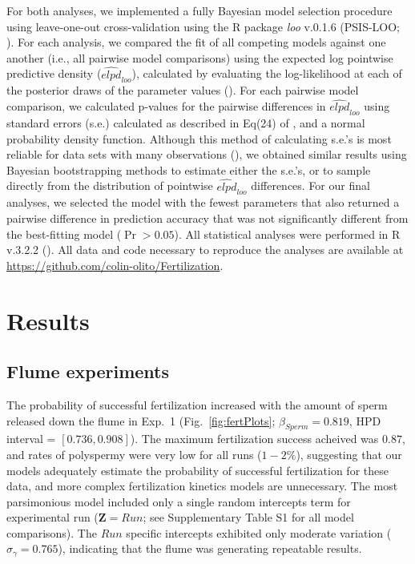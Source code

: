 \documentclass{article}
\begin{document}
	For both analyses, we implemented a fully Bayesian model selection procedure using leave-one-out cross-validation using the R package \textit{loo} v.0.1.6 (PSIS-LOO; \citealt{Vehtari2016}). For each analysis, we compared the fit of all competing models against one another (i.e., all pairwise model comparisons) using the expected log pointwise predictive density ($\widehat{\textit{elpd}}_{\textit{loo}}$), calculated by evaluating the log-likelihood at each of the posterior draws of the parameter values (\citealt{HootenHobbs2015,Vehtari2016}). For each pairwise model comparison, we calculated p-values for the pairwise differences in $\widehat{\textit{elpd}}_{\textit{loo}}$ using standard errors (s.e.) calculated as described in Eq(24) of \citet{Vehtari2016}, and a normal probability density function. Although this method of calculating s.e.'s is most reliable for data sets with many observations (\citealt{Vehtari2016}), we obtained similar results using Bayesian bootstrapping methods to estimate either the s.e.'s, or to sample directly from the distribution of pointwise $\widehat{\textit{elpd}}_{\textit{loo}}$ differences. For our final analyses, we selected the model with the fewest parameters that also returned a pairwise difference in prediction accuracy that was not significantly different from the best-fitting model ($\Pr > 0.05$). All statistical analyses were performed in R v.3.2.2 (\citealt{R2016}). All data and code necessary to reproduce the analyses are available at \url{https://github.com/colin-olito/Fertilization}.

\section*{Results}

	\subsection*{Flume experiments}

	The probability of successful fertilization increased with the amount of sperm released down the flume in Exp.~1 (Fig.~\ref{fig:fertPlots}; $\beta_{Sperm} = 0.819$, HPD interval = $[0.736,0.908]$). The maximum fertilization success acheived was $0.87$, and rates of polyspermy were very low for all runs ($1-2\%$), suggesting that our models adequately estimate the probability of successful fertilization for these data, and more complex fertilization kinetics models are unnecessary. The most parsimonious model included only a single random intercepts term for experimental run ($\mathbf{Z} = Run$; see Supplementary Table S1 for all model comparisons). The $Run$ specific intercepts exhibited only moderate variation ($\sigma_{\gamma} = 0.765$), indicating that the flume was generating repeatable results.
\end{document}
